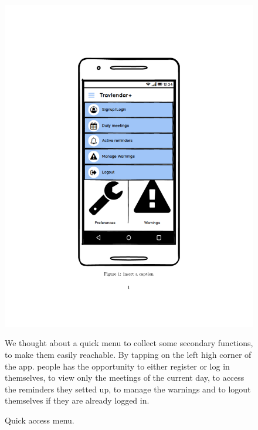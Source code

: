 	\begin{figure}
	\centering
	\includegraphics[width=0.6\linewidth]{mockups/QuickMenu}
	\caption{Quick access menu.}
	\label{fig:quickmenu}
	\begin{center}
		We thought about a quick menu to collect some secondary functions, to make them easily reachable. By tapping on the left high corner of the app. people has the opportunity to either register or log in themselves, to view only the meetings of the current day, to access the reminders they setted up, to manage the warnings and to logout themselves if they are already logged in.
	\end{center}
	\end{figure}
\clearpage
